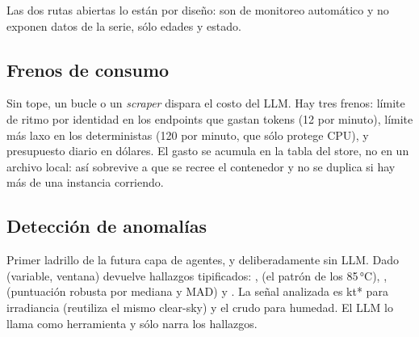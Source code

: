 Las dos rutas abiertas lo están por diseño: son de monitoreo automático y no exponen
datos de la serie, sólo edades y estado.

\subsection{Frenos de consumo}

Sin tope, un bucle o un \emph{scraper} dispara el costo del LLM. Hay tres frenos:
límite de ritmo por identidad en los endpoints que gastan tokens (12 por minuto),
límite más laxo en los deterministas (120 por minuto, que sólo protege CPU), y
presupuesto diario en dólares. El gasto se acumula en la tabla  del
store, no en un archivo local: así sobrevive a que se recree el contenedor y no se
duplica si hay más de una instancia corriendo.

\subsection{Detección de anomalías}

Primer ladrillo de la futura capa de agentes, y deliberadamente sin LLM. Dado
(variable, ventana) devuelve hallazgos tipificados: ,
 (el patrón de los 85\,°C), , 
(puntuación robusta por mediana y MAD) y . La señal analizada es kt* para
irradiancia (reutiliza el mismo clear-sky) y el crudo para humedad. El LLM lo llama
como herramienta y sólo narra los hallazgos.
